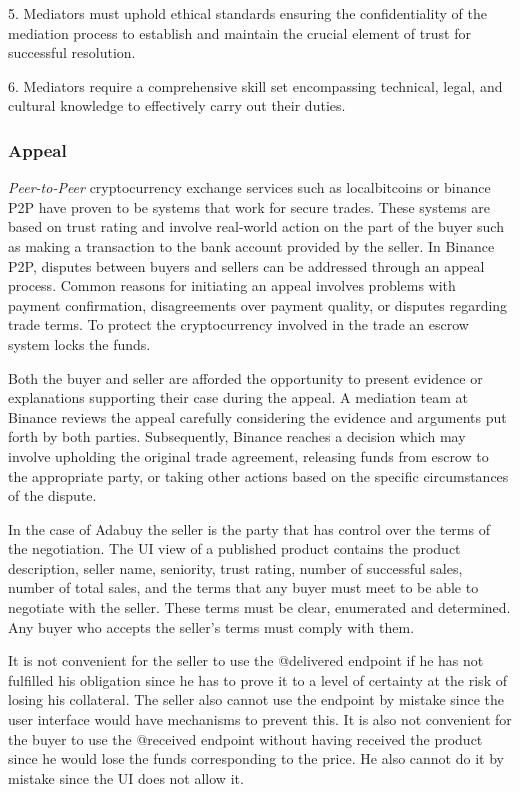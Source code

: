 \documentclass[12pt]{article}
\begin{document}
5. Mediators must uphold ethical standards ensuring the confidentiality of the mediation process to establish and maintain the crucial element of trust for successful resolution.

6. Mediators require a comprehensive skill set encompassing technical, legal, and cultural knowledge to effectively carry out their duties.

\subsubsection { Appeal } 

\emph{Peer-to-Peer} cryptocurrency exchange services such as localbitcoins or binance P2P have proven to be systems that work for secure trades. These systems are based on trust rating and involve real-world action on the part of the buyer such as making a transaction to the bank account provided by the seller. In Binance P2P, disputes between buyers and sellers can be addressed through an appeal process. Common reasons for initiating an appeal involves problems with payment confirmation, disagreements over payment quality, or disputes regarding trade terms. To protect the cryptocurrency involved in the trade an escrow system locks the funds.

Both the buyer and seller are afforded the opportunity to present evidence or explanations supporting their case during the appeal. A mediation team at Binance reviews the appeal carefully considering the evidence and arguments put forth by both parties. Subsequently, Binance reaches a decision which may involve upholding the original trade agreement, releasing funds from escrow to the appropriate party, or taking other actions based on the specific circumstances of the dispute.

In the case of Adabuy the seller is the party that has control over the terms of the negotiation. The UI view of a published product contains the product description, seller name, seniority, trust rating, number of successful sales, number of total sales, and the terms that any buyer must meet to be able to negotiate with the seller. These terms must be clear, enumerated and determined. Any buyer who accepts the seller's terms must comply with them.

It is not convenient for the seller to use the @delivered endpoint if he has not fulfilled his obligation since he has to prove it to a level of certainty at the risk of losing his collateral. The seller also cannot use the endpoint by mistake since the user interface would have mechanisms to prevent this. It is also not convenient for the buyer to use the @received endpoint without having received the product since he would lose the funds corresponding to the price. He also cannot do it by mistake since the UI does not allow it.
\end{document}
